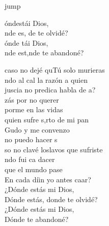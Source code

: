 \begin{cancion}jump\\
	\begin{chorus}%
		óndestái Dios,\\
		nde es, de te olvidé?\\
		ónde tái Dios,\\
		nde est,nde te abandoné?\jump\\
	\end{chorus}%
	caso no dejé quTú solo murieras\\
	ndo al cal la razón a quien\\
	juscia no predica habla de a?\\
	\jump
	zás por no querer \\
	porme en las vidas\\
	quien sufre s,rto de mi pan\\
	Gudo y me convenzo \\
	 no puedo hacer s\\
	\jump
	so no clavé loslavos que sufriste\\
	ndo fui ca dacer \\
	\jump
que el mundo pase\\
	En  cada díin yo antes caar?\\
	\jump
	\jump
¿Dónde estás mi Dios,\\
Dónde estás, donde te olvidé?\\
¿Dónde estás mi Dios,\\
Dónde te abandoné?\\
\end{cancion}%
